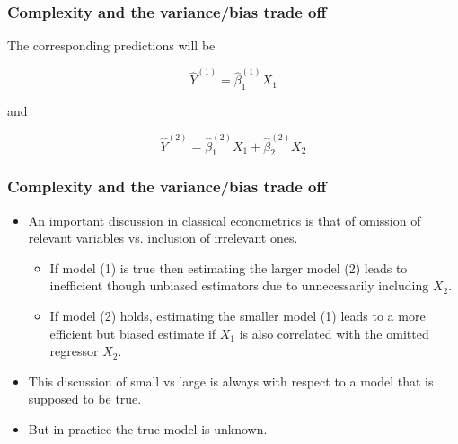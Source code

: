 \documentclass[
  shownotes,
  xcolor={svgnames},
  hyperref={colorlinks,citecolor=DarkBlue,linkcolor=DarkRed,urlcolor=DarkBlue}
  ]{beamer}
\begin{document}
\begin{frame}
\frametitle{Complexity and the variance/bias trade off}

The corresponding predictions will be

\begin{equation}\label{eq:3_2_3}
\hat{Y}^{(1)}=\hat{\beta}^{(1)}_1 X_1 
\end{equation}

and

\begin{equation}\label{eq:3_2_4}
\hat{Y}^{(2)}=\hat{\beta}^{(2)}_1 X_1 + \hat{\beta}^{(2)}_2 X_2 
\end{equation}

\end{frame}

\begin{frame}
\frametitle{Complexity and the variance/bias trade off}

\begin{itemize}
  \item An important discussion in classical econometrics is that of omission of relevant variables vs. inclusion of irrelevant ones. 
  \begin{itemize}
    \item If model (1) is true then estimating the larger model (2) leads to inefficient though unbiased estimators due to unnecessarily including $X_2$. 
    \item If model (2) holds, estimating the smaller model (1) leads to a more efficient but biased estimate if $X_1$ is also correlated with the omitted regressor $X_2$. 
  \end{itemize}
  \bigskip
  \item This discussion of small vs large is always with respect to a model that is supposed to be true.
  \bigskip
\item  But in practice the true model is unknown. 
\bigskip
\end{itemize}


\end{frame}
\end{document}
